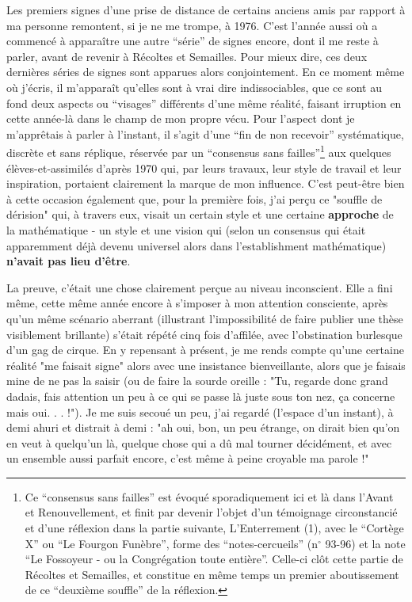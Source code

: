 Les premiers signes d'une prise de distance de certains anciens amis par rapport à ma personne remontent, si je ne me trompe, à 1976. C'est l'année aussi où a commencé à apparaître une autre ``série'' de signes encore, dont il me reste à parler, avant de revenir à Récoltes et Semailles. Pour mieux dire, ces deux dernières séries de signes sont apparues alors conjointement. En ce moment même où j'écris, il m'apparaît qu'elles sont à vrai dire indissociables, que ce sont au fond deux aspects ou ``visages'' différents d'une même réalité, faisant irruption en cette année-là dans le champ de mon propre vécu. Pour l'aspect dont je m'apprêtais à parler à l'instant, il s'agit d'une ``fin de non recevoir'' systématique, discrète et sans réplique, réservée par un ``consensus sans failles''\footnote{Ce ``consensus sans failles'' est évoqué sporadiquement ici et là dans l'Avant et Renouvellement, et finit par devenir l'objet d'un témoignage circonstancié et d'une réflexion dans la partie suivante, L'Enterrement (1), avec le ``Cortège X'' ou ``Le Fourgon Funèbre'', forme des ``notes-cercueils'' (n$^{\circ}$ 93-96) et la note ``Le Fossoyeur - ou la Congrégation toute entière''. Celle-ci clôt cette partie de Récoltes et Semailles, et constitue en même temps un premier aboutissement de ce ``deuxième souffle'' de la réflexion.} aux quelques élèves-et-assimilés d'après 1970 qui, par leurs travaux, leur style de travail et leur inspiration, portaient clairement la marque de mon influence. C'est peut-être bien à cette occasion également que, pour la première fois, j'ai perçu ce "souffle de dérision" qui, à travers eux, visait un certain style et une certaine \textbf{approche} de la mathématique - un style et une vision qui (selon un consensus qui était apparemment déjà devenu universel alors dans l'establishment mathématique) \textbf{n'avait pas lieu d'être}.

La preuve, c'était une chose clairement perçue au niveau inconscient. Elle a fini même, cette même année encore à s'imposer à mon attention consciente, après qu'un même scénario aberrant (illustrant l'impossibilité de faire publier une thèse visiblement brillante) s'était répété cinq fois d'affilée, avec l'obstination burlesque d'un gag de cirque. En y repensant à présent, je me rends compte qu'une certaine réalité "me faisait signe" alors avec une insistance bienveillante, alors que je faisais mine de ne pas la saisir (ou de faire la sourde oreille : "Tu, regarde donc grand dadais, fais attention un peu à ce qui se passe là juste sous ton nez, ça concerne mais oui. . . !"). Je me suis secoué un peu, j'ai regardé (l'espace d'un instant), à demi ahuri et distrait à demi : "ah oui, bon, un peu étrange, on dirait bien qu'on en veut à quelqu'un là, quelque chose qui a dû mal tourner décidément, et avec un ensemble aussi parfait encore, c'est même à peine croyable ma parole !"


